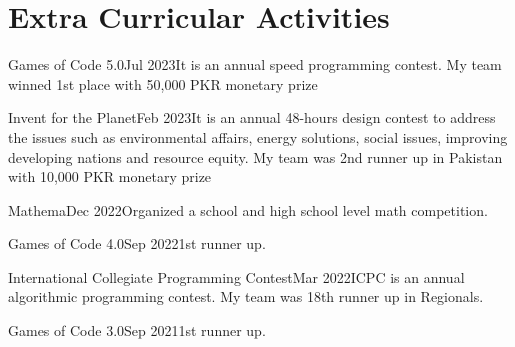 \section{Extra Curricular Activities}
\vspace{2pt}
\resumeSubHeadingListStart

\resumeOrganizationHeading
{Games of Code 5.0}{Jul 2023}{It is an annual speed programming contest. My team winned 1st place with 50,000 PKR monetary prize}

\resumeOrganizationHeading
{Invent for the Planet}{Feb 2023}{It is an annual 48-hours design contest to address the issues such as environmental affairs, energy solutions, social issues, improving developing nations and resource equity. My team was 2nd runner up in Pakistan with 10,000 PKR monetary prize}

\resumeOrganizationHeading
{Mathema}{Dec 2022}{Organized a school and high school level math competition.}

\resumeOrganizationHeading
{Games of Code 4.0}{Sep 2022}{1st runner up.}

\resumeOrganizationHeading
{International Collegiate Programming Contest}{Mar 2022}{ICPC is an annual algorithmic programming contest. My team was 18th runner up in Regionals.}

\resumeOrganizationHeading
{Games of Code 3.0}{Sep 2021}{1st runner up.}

\resumeSubHeadingListEnd
